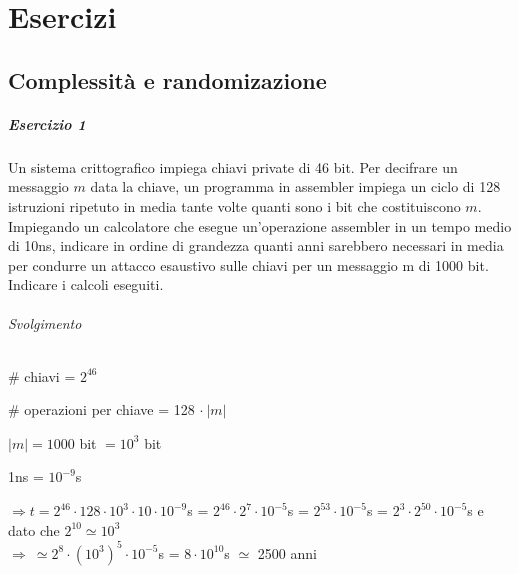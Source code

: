 \documentclass[10pt]{book}
\begin{document}
\chapter{Esercizi}
\section{Complessità e randomizazione}
\paragraph{Esercizio 1} Un sistema crittografico impiega chiavi private di 46 bit. Per decifrare un messaggio $m$ data la
chiave, un programma in assembler impiega un ciclo di 128 istruzioni ripetuto in media tante volte
quanti sono i bit che costituiscono $m$. Impiegando un calcolatore che esegue un'operazione
assembler in un tempo medio di 10ns, indicare in ordine di grandezza quanti anni sarebbero
necessari in media per condurre un attacco esaustivo sulle chiavi per un messaggio m di 1000 bit.\\
Indicare i calcoli eseguiti.
\subparagraph{Svolgimento} \begin{list}{}{}
	\item \# chiavi = $2^{46}$
	\item \# operazioni per chiave = 128 $\cdot\:|m|$
	\item $|m| = 1000$ bit $= 10^3$ bit
	\item 1ns = $10^{-9}$s
	\item $\Rightarrow t = 2^{46}\cdot128\cdot10^3\cdot10\cdot10^{-9}$s = $2^{46}\cdot2^7\cdot10^{-5}$s = $2^{53}\cdot10^{-5}$s = $2^3\cdot2^{50}\cdot10^{-5}$s e dato che $2^{10} \simeq 10^3$\\
	$\Rightarrow\:\simeq 2^8\cdot(10^3)^5\cdot10^{-5}$s = $8\cdot10^{10}$s $\simeq$ 2500 anni
\end{list}
\end{document}
